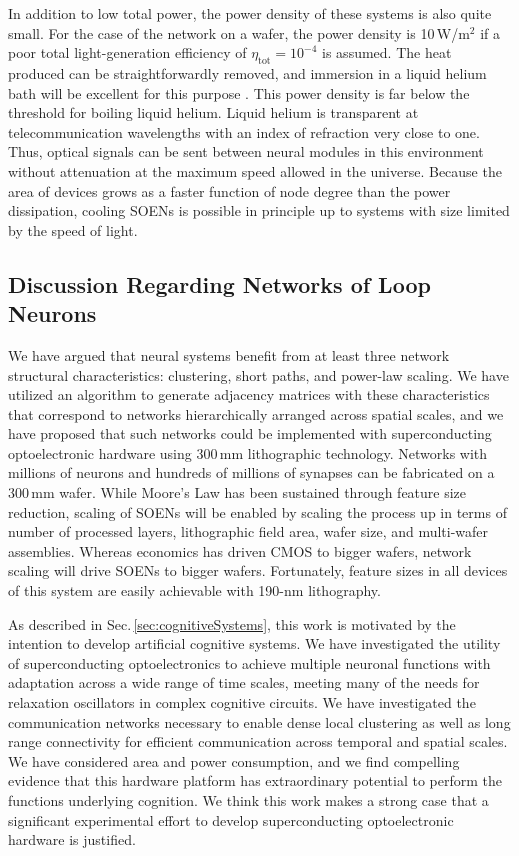\documentclass[twocolumn]{article}
\begin{document}
In addition to low total power, the power density of these systems is also quite small. For the case of the network on a wafer, the power density is 10\,W/m$^2$ if a poor total light-generation efficiency of $\eta_{\mathrm{tot}} = 10^{-4}$ is assumed. The heat produced can be straightforwardly removed, and immersion in a liquid helium bath will be excellent for this purpose \cite{ek2006}. This power density is far below the threshold for boiling liquid helium. Liquid helium is transparent at telecommunication wavelengths with an index of refraction very close to one. Thus, optical signals can be sent between neural modules in this environment without attenuation at the maximum speed allowed in the universe. Because the area of devices grows as a faster function of node degree than the power dissipation, cooling SOENs is possible in principle up to systems with size limited by the speed of light.

\subsection{\label{sec:discussion_networks}Discussion Regarding Networks of Loop Neurons}
We have argued that neural systems benefit from at least three network structural characteristics: clustering, short paths, and power-law scaling. We have utilized an algorithm to generate adjacency matrices with these characteristics that correspond to networks hierarchically arranged across spatial scales, and we have proposed that such networks could be implemented with superconducting optoelectronic hardware using 300\,mm lithographic technology. Networks with millions of neurons and hundreds of millions of synapses can be fabricated on a 300\,mm wafer. While Moore's Law has been sustained through feature size reduction, scaling of SOENs will be enabled by scaling the process up in terms of number of processed layers, lithographic field area, wafer size, and multi-wafer assemblies. Whereas economics has driven CMOS to bigger wafers, network scaling will drive SOENs to bigger wafers. Fortunately, feature sizes in all devices of this system are easily achievable with 190-nm lithography.

As described in Sec.\,\ref{sec:cognitiveSystems}, this work is motivated by the intention to develop artificial cognitive systems. We have investigated the utility of superconducting optoelectronics to achieve multiple neuronal functions with adaptation across a wide range of time scales, meeting many of the needs for relaxation oscillators in complex cognitive circuits. We have investigated the communication networks necessary to enable dense local clustering as well as long range connectivity for efficient communication across temporal and spatial scales. We have considered area and power consumption, and we find compelling evidence that this hardware platform has extraordinary potential to perform the functions underlying cognition. We think this work makes a strong case that a significant experimental effort to develop superconducting optoelectronic hardware is justified.
\end{document}
